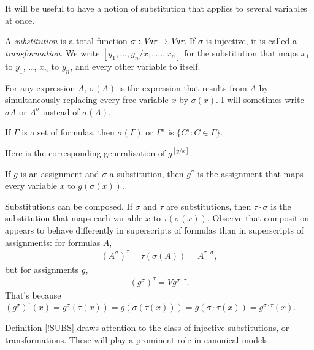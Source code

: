\documentclass[11pt]{woarticle}
\newcommand{\cmnt}[1]{\iffalse #1 \fi}
\theoremstyle{break}
\theoremstyle{nonumberplain}
\newcommand{\1}{\;\,|\;\,}
\begin{document}
It will be useful to have a notion of substitution that applies to several
variables at once. 

\begin{definition}[Substitution]\label{!SUBS}
  A \emph{substitution} is a total function $\sigma: \emph{Var} \to \emph{Var}$.
  If $\sigma$ is injective, it is called a \emph{transformation}. We write
  $[y_1,\ldots,y_n/x_1,\ldots,x_n]$ for the substitution that maps $x_1$ to
  $y_1$, \ldots, $x_n$ to $y_n$, and every other variable to itself.%
  \cmnt{%
    (So $[y_1,\ldots,y_n/x_1,\ldots,x_n]$ is only meaningful (and non-redundant)
    if the $x_1,\ldots,x_n$ are pairwise distinct.)%
  }

  For any expression $A$, $\sigma(A)$ is the expression that results from $A$ by
  simultaneously replacing every free variable $x$ by $\sigma(x)$. I will
  sometimes write $\sigma A$ or $A^\sigma$ instead of $\sigma(A)$.

  If $\Gamma$ is a set of formulas, then $\sigma(\Gamma)$ or $\Gamma^\sigma$ is
  $\{ C^\tau : C \in \Gamma \}$.

\end{definition}

Here is the corresponding generalisation of $g^{[y/x]}$.

\begin{definition}
  If $g$ is an assignment and $\sigma$ a substitution, then $g^\sigma$ is the
  assignment that maps every variable $x$ to $g(\sigma(x))$.
\end{definition}

Substitutions can be composed. If $\sigma$ and $\tau$ are substitutions, then
$\tau \cdot \sigma$ is the substitution that maps each variable $x$ to
$\tau(\sigma(x))$. Observe that composition appears to behave differently in
superscripts of formulas than in superscripts of assignments: for formulas
$A$,
\begin{gather*}
  (A^\sigma)^\tau = \tau(\sigma(A)) = A^{\tau \cdot \sigma},
\end{gather*}
but for assignments $g$,
\begin{gather*}
  (g^\sigma)^\tau = Vg^{\sigma \cdot \tau}.
\end{gather*}
That's because
$(g^\sigma)^\tau(x) = g^\sigma(\tau(x)) = g(\sigma(\tau(x))) = g(\sigma\cdot\tau(x)) = g^{\sigma\cdot\tau}(x)$.

Definition \ref{!SUBS} draws attention to the class of injective substitutions,
or transformations. These will play a prominent role in canonical models.
\end{document}
